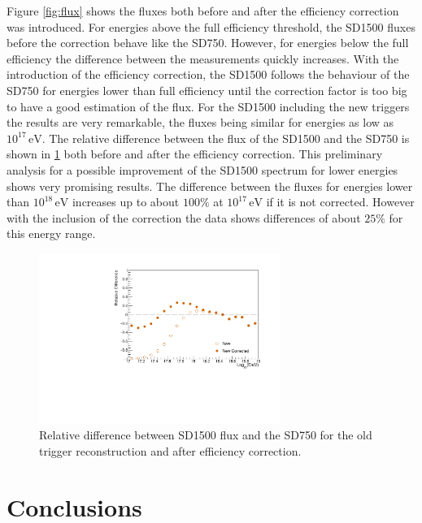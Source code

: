 \documentclass[12pt,a4paper]{article}
\newcommand{\eV}{\, \mathrm{eV}}
\begin{document}
Figure \ref{fig:flux} shows the fluxes both before and after the efficiency correction was introduced. For energies above the full efficiency threshold, the SD1500 fluxes before the correction behave like the SD750. However, for energies below the full efficiency the difference between the measurements quickly increases. With the introduction of the efficiency correction, the SD1500 follows the behaviour of the SD750 for energies lower than full efficiency until the correction factor is too big to have a good estimation of the flux.
For the SD1500 including the new triggers the results are very remarkable, the fluxes being similar for energies as low as $10^17{\eV}$. The relative difference between the flux of the SD1500 and the SD750 is shown in \cref{fig:difference} both before and after the efficiency correction. This preliminary analysis for a possible improvement of the SD1500 spectrum for lower energies shows very promising results. The difference between the fluxes for energies lower than $10^{18}\eV$ increases up to about $100\%$ at $10^{17}\eV$ if it is not corrected. However with the inclusion of the correction the data shows differences of about $25\%$ for this energy range. 

\begin{figure}[H]
    \begin{center}
        \includegraphics[width=0.7\textwidth]{plots/NewDifference.pdf}
        \caption{Relative difference between SD1500 flux and the SD750 for the old trigger reconstruction and after efficiency correction.
        \label{fig:difference}}
        \vspace{-0.5cm}
    \end{center}
\end{figure} 

\section*{Conclusions}
\end{document}
